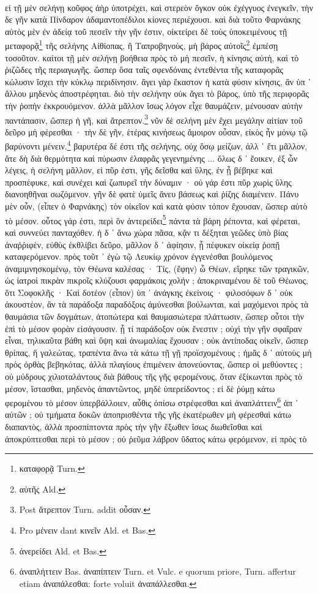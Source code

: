\documentclass[a4paper, 11pt, oneside, polutonikogreek, german]{article}
\begin{document}
\paragraph{}
εἰ τῇ μὲν σελήνῃ κοῦφος ἀὴρ ὑποτρέχει, καὶ στερεὸν ὄγκον οὐκ ἐχέγγυος ἐνεγκεῖν, τὴν δε γῆν κατὰ Πίνδαρον ἀδαμαντοπέδιλοι κίονες περιέχουσι. καὶ διὰ τοῦτο Φαρνάκης αὐτὸς μὲν ἐν ἀδείᾳ τοῦ πεσεῖν τὴν γῆν ἐστιν, οἰκτείρει δὲ τοὺς ὑποκειμένους τῇ μεταφορᾷ\footnote{καταφορᾷ Turn.} τῆς σελήνης Αἰθίοπας, ἢ Ταπροβηνοὺς, μὴ βάρος αὐτοῖς\footnote{αὐτῆς Ald.} ἐμπέσῃ τοσοῦτον. καίτοι τῇ μὲν σελήνῃ βοήθεια πρὸς τὸ μὴ πεσεῖν, ἡ κίνησις αὐτὴ, καὶ τὸ ῥιζῶδες τῆς περιαγωγῆς. ὥσπερ ὅσα ταῖς σφενδόναις ἐντεθέντα τῆς καταφορᾶς κώλυσιν ἴσχει τὴν κύκλῳ περιδίνησιν. ἄγει γὰρ ἕκαστον ἡ κατὰ φύσιν κίνησις, ἂν ὑπ ᾽ ἄλλου μηδενὸς ἀποστρέφηται. διὸ τὴν σελήνην οὐκ ἄγει τὸ βάρος, ὑπὸ τῆς περιφορᾶς τὴν ῥοπὴν ἐκκρουόμενον. ἀλλὰ μᾶλλον ἴσως λόγον εἶχε θαυμάζειν, μένουσαν αὐτὴν παντάπασιν, ὥσπερ ἡ γῆ, καὶ ἄτρεπτον.\footnote{Post ἄτρεπτον Turn. addit οὖσαν.} νῦν δὲ σελήνη μὲν ἔχει μεγάλην αἰτίαν τοῦ δεῦρο μὴ φέρεσθαι · τὴν δὲ γῆν, ἑτέρας κινήσεως ἄμοιρον οὖσαν, εἰκὸς ἦν μόνῳ τῷ βαρύνοντι μένειν.\footnote{Pro μένειν dant κινεῖν Ald. et Bas.} βαρυτέρα δέ ἐστι τῆς σελήνης, οὐχ ὅσῳ μείζων, ἀλλ ᾽ ἔτι μᾶλλον, ἅτε δὴ διὰ θερμότητα καὶ πύρωσιν ἐλαφρᾶς γεγενημένης ... ὅλως δ ᾽ ἔοικεν, ἐξ ὧν λέγεις, ἡ σελήνη μᾶλλον, εἰ πῦρ ἐστι, γῆς δεῖσθα καὶ ὕλης, ἐν ᾗ βέβηκε καὶ προσπέφυκε, καὶ συνέχει καὶ ζωπυρεῖ τὴν δύναμιν · οὐ γάρ ἐστι πῦρ χωρὶς ὕλης διανοηθῆναι σωζόμενον. γῆν δὲ φατὲ ὑμεῖς ἄνευ βάσεως καὶ ῥίζης διαμένειν. Πάνυ μὲν οὖν, (εἶπεν ὁ Φαρνάκης) τὸν οἰκεῖον καὶ κατὰ φύσιν τόπον ἔχουσαν, ὥσπερ αὐτὸ τὸ μέσον. οὗτος γάρ ἐστι, περὶ ὃν ἀντερείδει\footnote{ἀνερείδει Ald. et Bas.} πάντα τὰ βάρη ῥέποντα, καὶ φέρεται, καὶ συννεύει πανταχόθεν. ἡ δ ᾽ ἄνω χώρα πᾶσα, κᾄν τι δέξηται γεῶδες ὑπὸ βίας ἀναῤῥιφὲν, εὐθὺς ἐκθλίβει δεῦρο, μᾶλλον δ ᾽ ἀφίησιν, ᾗ πέφυκεν οἰκείᾳ ῥοπῇ καταφερόμενον. πρὸς τοῦτ ᾽ ἐγὼ τῷ Λευκίῳ χρόνον ἐγγενέσθαι βουλόμενος ἀναμιμνησκομένῳ, τὸν Θέωνα καλέσας · Τίς, (ἔφην) ὦ Θέων, εἴρηκε τῶν τραγικῶν, ὡς ἰατροὶ πικρὰν πικροῖς κλύζουσι φαρμάκοις χολήν ; ἀποκριναμένου δὲ τοῦ Θέωνος, ὅτι Σοφοκλῆς · Καὶ δοτέον (εἶπον) ὑπ ᾽ ἀνάγκης ἐκείνοις · φιλοσόφων δ ᾽ οὐκ ἀκουστέον, ἂν τὰ παράδοξα παραδόξοις ἀμύνεσθαι βούλωνται, καὶ μαχόμενοι πρὸς τὰ θαυμάσια τῶν δογμάτων, ἀτοπώτερα καὶ θαυμασιώτερα πλάττωσιν, ὥσπερ οὗτοι τὴν ἐπὶ τὸ μέσον φορὰν εἰσάγουσιν. ᾗ τί παράδοξον οὐκ ἔνεστιν ; οὐχὶ τὴν γῆν σφαῖραν εἶναι, τηλικαῦτα βάθη καὶ ὕψη καὶ ἀνωμαλίας ἔχουσαν ; οὐκ ἀντίποδας οἰκεῖν, ὥσπερ θρίπας, ἢ γαλεώτας, τραπέντα ἄνω τὰ κάτω τῇ γῇ προϊσχομένους ; ἡμᾶς δ ᾽ αὐτοὺς μὴ πρὸς ὀρθὰς βεβηκότας, ἀλλὰ πλαγίους ἐπιμένειν ἀπονεύοντας, ὥσπερ οἱ μεθύοντες ; οὐ μύδρους χιλιοταλάντους διὰ βάθους τῆς γῆς φερομένους, ὅταν ἐξίκωνται πρὸς τὸ μέσον, ἵστασθαι, μηδενὸς ἀπαντῶντος, μηδὲ ὑπερείδοντος ; εἰ δὲ ῥύμῃ κάτω φερομένου τὸ μέσον ὑπερβάλλοιεν, αὖθις ὀπίσω στρέφεσθαι καὶ ἀναπλάττειν\footnote{ἀναπλήττειν Bas. ἀναπίπτειν Turn. et Vulc. e quorum priore, Turn. affertur etiam ἀναπάλεσθαι: forte voluit ἀναπάλλεσθαι.} ἀπ ᾽ αύτῶν ; οὐ τμήματα δοκῶν ἀποπρισθέντα τῆς γῆς ἑκατέρωθεν μὴ φέρεσθαὶ κάτω διαπαντὸς, ἀλλὰ προσπίπτοντα πρὸς τὴν γῆν ἔξωθεν ἴσως διωθεῖσθαι καὶ ἀποκρύπτεσθαι περὶ τὸ μέσον ; οὐ ῥεῦμα λάβρον ὕδατος κάτω φερόμενον, εἰ πρὸς τὸ 
\end{document}
